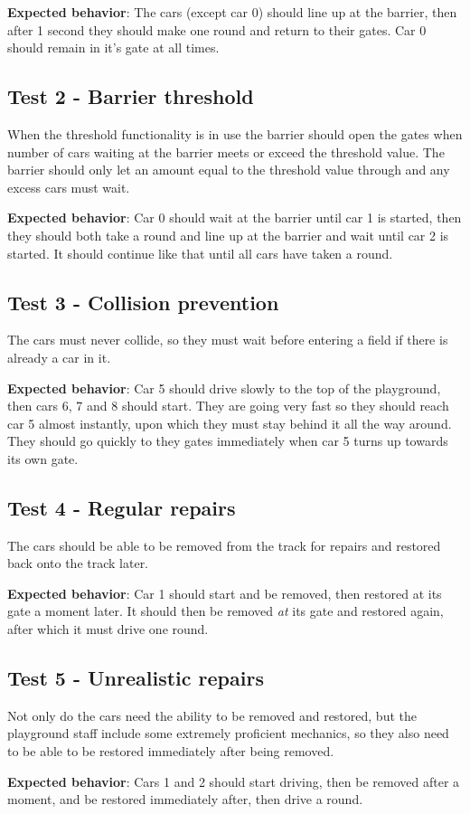 \textbf{Expected behavior}: The cars (except car 0) should line up at the barrier, then after 1 second they should make one round and return to their gates. Car 0 should remain in it's gate at all times.

\subsection*{Test 2 - Barrier threshold}
When the threshold functionality is in use the barrier should open the gates when number of cars waiting at the barrier meets or exceed the threshold value. The barrier should only let an amount equal to the threshold value through and any excess cars must wait.

\textbf{Expected behavior}: Car 0 should wait at the barrier until car 1 is started, then they should both take a round and line up at the barrier and wait until car 2 is started. It should continue like that until all cars have taken a round.

\subsection*{Test 3 - Collision prevention}
The cars must never collide, so they must wait before entering a field if there is already a car in it.

\textbf{Expected behavior}: Car 5 should drive slowly to the top of the playground, then cars 6, 7 and 8 should start. They are going very fast so they should reach car 5 almost instantly, upon which they must stay behind it all the way around. They should go quickly to they gates immediately when car 5 turns up towards its own gate.

\subsection*{Test 4 - Regular repairs}
The cars should be able to be removed from the track for repairs and restored back onto the track later.

\textbf{Expected behavior}: Car 1 should start and be removed, then restored at its gate a moment later. It should then be removed \emph{at} its gate and restored again, after which it must drive one round.

\subsection*{Test 5 - Unrealistic repairs}
Not only do the cars need the ability to be removed and restored, but the playground staff include some extremely proficient mechanics, so they also need to be able to be restored immediately after being removed.

\textbf{Expected behavior}: Cars 1 and 2 should start driving, then be removed after a moment, and be restored immediately after, then drive a round.

